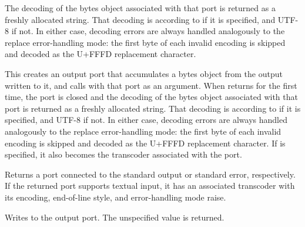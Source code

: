 \begin{entry}{%
}

The decoding of the bytes object associated with that port is returned
as a freshly allocated string.  That decoding is according to
 if it is specified, and UTF-8 if not.  In either
case, decoding errors are always handled analogously to the {\cf
  replace} error-handling mode: the first byte of each invalid
encoding is skipped and decoded as the U+FFFD replacement character.
\end{entry}

\begin{entry}{%
}
   
 This
creates an output port that accumulates a bytes object from the output
written to it, and calls  with that port as an argument.
When  returns for the first time, the port is closed and the
decoding of the bytes object associated with that port is returned as
a freshly allocated string.  That decoding is according to
 if it is specified, and UTF-8 if not.  In either
case, decoding errors are always handled analogously to the {\cf
  replace} error-handling mode: the first byte of each invalid
encoding is skipped and decoded as the U+FFFD replacement character.
If  is specified, it also becomes the transcoder
associated with the port.
\end{entry}

\begin{entry}{%
}
   
Returns a port connected to the standard output or standard error,
respectively. If the returned port supports textual input, it has an
associated transcoder with its encoding, end-of-line style, and
error-handling mode {\cf raise}.
\end{entry}

\begin{entry}{%
}

Writes  to the output port. The unspecified value is returned.
\end{entry}

